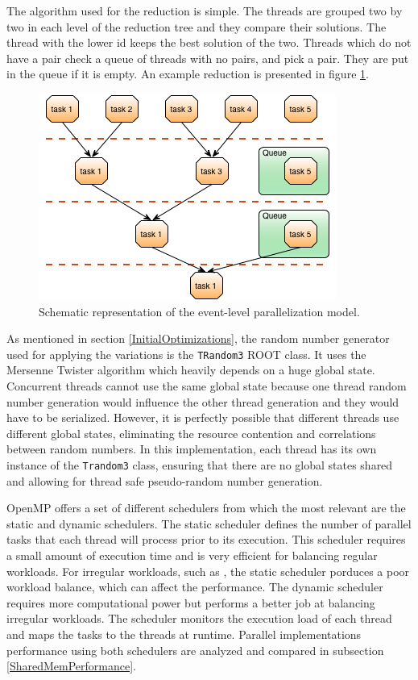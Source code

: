 The algorithm used for the reduction is simple. The threads are grouped two by two in each level of the reduction tree and they compare their solutions. The thread with the lower id keeps the best solution of the two. Threads which do not have a pair check a queue of threads with no pairs, and pick a pair. They are put in the queue if it is empty. An example reduction is presented in figure \ref{fig:Reduction}.

\begin{figure}[!htp]
	\begin{center}
		\includegraphics[scale=0.7]{../../common/img/parallel_reduction_example.png}
		\caption{Schematic representation of the event-level parallelization model.}
		\label{fig:Reduction}
	\end{center}
\end{figure}

As mentioned in section \ref{InitialOptimizations}, the random number generator used for applying the variations is the \texttt{TRandom3} ROOT class. It uses the Mersenne Twister algorithm which heavily depends on a huge global state. Concurrent threads cannot use the same global state because one thread random number generation would influence the other thread generation and they would have to be serialized. However, it is perfectly possible that different threads use different global states, eliminating the resource contention and correlations between random numbers. In this implementation, each thread has its own instance of the \texttt{Trandom3} class, ensuring that there are no global states shared and allowing for thread safe pseudo-random number generation.

OpenMP offers a set of different schedulers from which the most relevant are the static and dynamic schedulers. The static scheduler defines the number of parallel tasks that each thread will process prior to its execution. This scheduler requires a small amount of execution time and is very efficient for balancing regular workloads. For irregular workloads, such as \ttDilepKinFit, the static scheduler porduces a poor workload balance, which can affect the performance. The dynamic scheduler requires more computational power but performs a better job at balancing irregular workloads. The scheduler monitors the execution load of each thread and maps the tasks to the threads at runtime. Parallel implementations performance using both schedulers are analyzed and compared in subsection \ref{SharedMemPerformance}.

